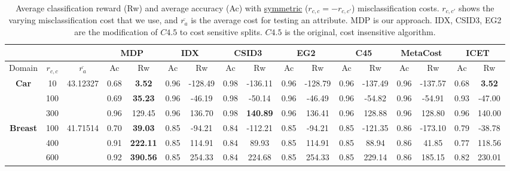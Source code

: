 \documentclass[letterpaper]{article}
\theoremstyle{definition}
\begin{document}
\begin{table}[t]
\centering
\scriptsize
\caption{Average classification reward (Rw) and average accuracy (Ac) with \underline{symmetric} ($r_{c,c}=-r_{c,c'}$) misclassification costs. $r_{c,c'}$ shows the varying misclassification cost that we use, and $\overline{r_a}$ is the average cost for testing an attribute. MDP is our approach. IDX, CSID3, EG2 are the modification of $C4.5$ to cost sensitive splits. $C4.5$ is the original, cost insensitive algorithm.}
\label{tbl:symmetric}
\begin{tabular}{|c|c|c|c|c|c|c|c|c|c|c|c|c|c|c|c|c|}
\hline
&&& \multicolumn{2}{c|}{MDP}     & \multicolumn{2}{c|}{IDX} & \multicolumn{2}{c|}{CSID3}   & \multicolumn{2}{c|}{EG2} & \multicolumn{2}{c|}{C45}    & \multicolumn{2}{c|}{MetaCost} & \multicolumn{2}{c|}{ICET}    \\ \hline
Domain&$r_{c,c}$&$\overline{r_a}$&Ac&Rw&Ac&Rw&Ac&Rw&Ac&Rw&Ac&Rw&Ac&Rw&Ac&Rw \\ \hline

\multirow{3}{*}{\textbf{Car}}       & 10       & 43.12327 & 0.68  & \textbf{3.52}    & 0.96  & -128.49          & 0.98   & -136.11           & 0.96      & -128.79      & 0.96  & -137.49          & 0.96     & -137.57            & 0.68   & \textbf{3.52}    \\ \cline{2-17}
                                    & 100      &          & 0.69  & \textbf{35.23}   & 0.96  & -46.19           & 0.98   & -50.14            & 0.96      & -46.49       & 0.96  & -54.82           & 0.96     & -54.91             & 0.93   & -47.00           \\ \cline{2-17}
                                    & 300      &          & 0.96  & 129.45           & 0.96  & 136.70           & 0.98   & \textbf{140.89}   & 0.96      & 136.41       & 0.96  & 128.88           & 0.96     & 128.80             & 0.96   & 140.00           \\ \hline
\multirow{3}{*}{\textbf{Breast}}    & 100      & 41.71514 & 0.70  & \textbf{39.03}   & 0.85      & -94.21       & 0.84   & -112.21           & 0.85      & -94.21       & 0.85      & -121.35      & 0.86         & -173.10        & 0.79   & -38.78           \\ \cline{2-17}
                                    & 400      &          & 0.91  & \textbf{222.11}  & 0.85      & 114.91       & 0.84   & 89.93             & 0.85      & 114.91       & 0.85      & 88.94        & 0.86         & 41.85          & 0.77   & 118.56           \\ \cline{2-17}
                                    & 600      &          & 0.92  & \textbf{390.56}  & 0.85      & 254.33       & 0.84   & 224.68            & 0.85      & 254.33       & 0.85      & 229.14       & 0.86         & 185.15         & 0.82   & 230.01           \\ \hline


\end{tabular}
\end{table}
\end{document}
